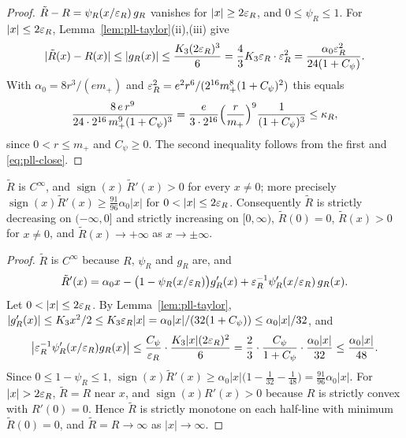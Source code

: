 \begin{proof}
$\tilde R-R=\psi_R(x/\varepsilon_R)\,g_R$ vanishes for $|x|\ge2\varepsilon_R$, and $0\le\psi_R\le1$. For $|x|\le2\varepsilon_R$,
Lemma~\ref{lem:pll-taylor}(ii),(iii) give
\[
 |\tilde R(x)-R(x)|\le|g_R(x)|\le\frac{K_3(2\varepsilon_R)^3}6=\frac43K_3\varepsilon_R\cdot\varepsilon_R^2
 =\frac{\alpha_0\varepsilon_R^2}{24(1+C_\psi)} .
\]
With $\alpha_0=8r^3/(em_+)$ and $\varepsilon_R^2=e^2r^6/(2^{16}m_+^8(1+C_\psi)^2)$ this equals
\[
 \frac{8\,e\,r^9}{24\cdot2^{16}\,m_+^9(1+C_\psi)^3}
 =\frac{e}{3\cdot2^{16}}\Bigl(\frac r{m_+}\Bigr)^9\frac1{(1+C_\psi)^3}\le\kappa_R,
\]
since $0<r\le m_+$ and $C_\psi\ge0$. The second inequality follows from the first and \eqref{eq:pll-close}.
\end{proof}

\begin{lemma}[Monotonicity]\label{lem:pll-Rtilde-mono}
$\tilde R$ is $C^\infty$, and $\operatorname{sign}(x)\,\tilde R'(x)>0$ for every $x\ne0$; more precisely
$\operatorname{sign}(x)\tilde R'(x)\ge\frac{91}{96}\alpha_0|x|$ for $0<|x|\le2\eps_R$. Consequently $\tilde R$ is
strictly decreasing on $(-\infty,0]$ and strictly increasing on $[0,\infty)$, $\tilde R(0)=0$, $\tilde R(x)>0$
for $x\ne0$, and $\tilde R(x)\to+\infty$ as $x\to\pm\infty$.
\end{lemma}

\begin{proof}
$\tilde R$ is $C^\infty$ because $R$, $\psi_R$ and $g_R$ are, and
\[
 \tilde R'(x)=\alpha_0x-\bigl(1-\psi_R(x/\varepsilon_R)\bigr)g_R'(x)+\varepsilon_R^{-1}\psi_R'(x/\varepsilon_R)\,g_R(x).
\]
Let $0<|x|\le2\eps_R$. By Lemma~\ref{lem:pll-taylor},
$|g_R'(x)|\le K_3x^2/2\le K_3\varepsilon_R|x|=\alpha_0|x|/(32(1+C_\psi))\le\alpha_0|x|/32$, and
\[
 \bigl|\varepsilon_R^{-1}\psi_R'(x/\varepsilon_R)g_R(x)\bigr|\le\frac{C_\psi}{\varepsilon_R}\cdot\frac{K_3|x|(2\varepsilon_R)^2}{6}
 =\frac23\cdot\frac{C_\psi}{1+C_\psi}\cdot\frac{\alpha_0|x|}{32}\le\frac{\alpha_0|x|}{48}.
\]
Since $0\le1-\psi_R\le1$,
$\operatorname{sign}(x)\tilde R'(x)\ge\alpha_0|x|\bigl(1-\frac1{32}-\frac1{48}\bigr)=\frac{91}{96}\alpha_0|x|$.
For $|x|>2\eps_R$, $\tilde R=R$ near $x$, and $\operatorname{sign}(x)R'(x)>0$ because $R$ is strictly convex with
$R'(0)=0$. Hence $\tilde R$ is strictly monotone on each half-line with minimum $\tilde R(0)=0$, and
$\tilde R=R\to\infty$ as $|x|\to\infty$.
\end{proof}


